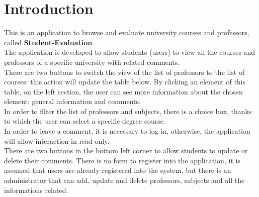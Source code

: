 \documentclass[a4paper, oneside]{article}
\begin{document}
\baselineskip 13pt
	
\begin{frontespizio} 
 \Preambolo{\renewcommand{\frontpretitlefont}{\fontsize{15}{12}\scshape}}
\Rientro {1cm}
 \Punteggiatura {}
\end{frontespizio}

\clearpage

	\tableofcontents
	\clearpage


\section{Introduction}
This is an application to browse and evaluate university courses and professors, called \textbf{Student-Evaluation}.\\
The application is developed to allow students (users) to view all the courses and professors of a specific university with related comments.\\ 
There are two buttons to switch the view of the list of professors to the list of courses: this action will update the table below. By clicking an element of this table, on the left section, the user can see more information about the chosen element: general information and comments.\\ 
In order to filter the list of professors and subjects, there is a choice box, thanks to which the user can select a specific degree course. \\
In order to leave a comment, it is necessary to log in, otherwise, the application will allow interaction in read-only.\\
There are two buttons in the bottom left corner to allow students to update or delete their comments.
There is no form to register into the application, it is assumed that users are already registered into the system, but there is an administrator that can add, update and delete professors, subjects and  all the informations related.
\end{document}

